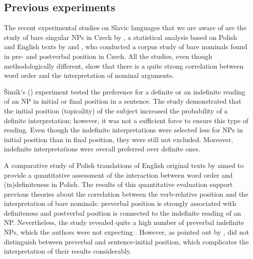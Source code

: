 \documentclass[output=paper]{langsci/langscibook}
\begin{document}
\subsection{Previous experiments}\label{2sec:31}

The recent experimental studies on Slavic languages that we are aware of are the study of bare singular NPs in Czech by \cite{simik:14}, a statistical analysis based on Polish and English texts by \cite{czardybon:hellwig:petersen:14} and \cite{simik:burianova:18}, who conducted a corpus study of bare nominals found in pre- and postverbal position in Czech. All the studies, even though methodologically different, show that there is a quite strong correlation between word order and the interpretation of nominal arguments.

\v{S}im\'ik's (\citeyear{simik:14}) experiment tested the preference for a definite or an indefinite reading of an NP in initial or final position in a sentence. The study demonstrated that the initial position (topicality) of the subject increased the probability of a definite interpretation; however, it was not a sufficient force to ensure this type of reading. Even though the indefinite interpretations were selected less for NPs in initial position than in final position, they were still not excluded. Moreover, indefinite interpretations were overall preferred over definite ones.

{
A comparative study of Polish translations of English original texts by \cite{czardybon:hellwig:petersen:14} aimed to provide a quantitative assessment of the interaction between word order and (in)definiteness in Polish. The results of this quantitative evaluation support previous theories about the correlation between the verb-relative position and the interpretation of bare nominals: preverbal position is strongly associated with definiteness and postverbal position is connected to the indefinite reading of an NP. Nevertheless, the study revealed quite a high number of preverbal indefinite NPs, which the authors were not expecting \citep[][147-148]{czardybon:hellwig:petersen:14}. However, as pointed out by \cite{simik:burianova:18}, \cite{czardybon:hellwig:petersen:14} did not distinguish between preverbal and sentence-initial position, which complicates the interpretation of their results considerably.
}
\end{document}
